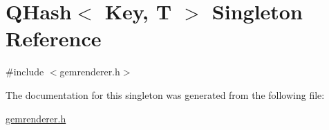 \hypertarget{singleton_q_hash}{\section{Q\+Hash$<$ Key, T $>$ Singleton Reference}
\label{singleton_q_hash}
}


{\ttfamily \#include $<$gemrenderer.\+h$>$}



The documentation for this singleton was generated from the following file\+:\begin{DoxyCompactItemize}
\item 
\hyperlink{gemrenderer_8h}{gemrenderer.\+h}\end{DoxyCompactItemize}
